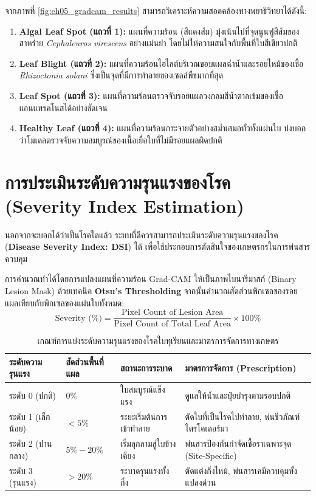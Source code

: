 จากภาพที่ \ref{fig:ch05_gradcam_results} สามารถวิเคราะห์ความสอดคล้องทางพยาธิวิทยาได้ดังนี้:
\begin{enumerate}[leftmargin=1.5em, itemsep=2pt]
    \item \textbf{Algal Leaf Spot (แถวที่ 1):} แผนที่ความร้อน (สีแดงส้ม) มุ่งเน้นไปที่จุดนูนฟูสีส้มของสาหร่าย \textit{Cephaleuros virescens} อย่างแม่นยำ โดยไม่ให้ความสนใจกับพื้นที่ใบสีเขียวปกติ
    \item \textbf{Leaf Blight (แถวที่ 2):} แผนที่ความร้อนไฮไลต์บริเวณขอบแผลฉ่ำน้ำและรอยไหม้ของเชื้อ \textit{Rhizoctonia solani} ซึ่งเป็นจุดที่มีการทำลายของเซลล์พืชมากที่สุด
    \item \textbf{Leaf Spot (แถวที่ 3):} แผนที่ความร้อนตรวจจับรอยแผลวงกลมสีน้ำตาลเข้มของเชื้อแอนแทรคโนสได้อย่างชัดเจน
    \item \textbf{Healthy Leaf (แถวที่ 4):} แผนที่ความร้อนกระจายตัวอย่างสม่ำเสมอทั่วทั้งแผ่นใบ บ่งบอกว่าโมเดลตรวจจับความสมบูรณ์ของเนื้อเยื่อใบที่ไม่มีรอยแผลผิดปกติ
\end{enumerate}

\section{การประเมินระดับความรุนแรงของโรค (Severity Index Estimation)}

นอกจากจะบอกได้ว่าเป็นโรคใดแล้ว ระบบที่ดีควรสามารถประเมินระดับความรุนแรงของโรค (\textbf{Disease Severity Index: DSI}) ได้ เพื่อใช้ประกอบการตัดสินใจของเกษตรกรในการพ่นสารควบคุม

การคำนวณทำได้โดยการแปลงแผนที่ความร้อน Grad-CAM ให้เป็นภาพไบนารีมาสก์ (Binary Lesion Mask) ด้วยเทคนิค \textbf{Otsu's Thresholding} จากนั้นคำนวณสัดส่วนพิกเซลของรอยแผลเทียบกับพิกเซลของแผ่นใบทั้งหมด:
\begin{equation}
\text{Severity (\%)} = \frac{\text{Pixel Count of Lesion Area}}{\text{Pixel Count of Total Leaf Area}} \times 100\%
\end{equation}

\begin{table}[H]
\caption{เกณฑ์การแบ่งระดับความรุนแรงของโรคใบทุเรียนและมาตรการจัดการทางเกษตร}
\label{tab:ch05_severity_levels}
\begin{tabularx}{\textwidth}{L{2.0cm}C{2.0cm}L{2.6cm}Y}
\toprule
\textbf{ระดับความรุนแรง} & \textbf{สัดส่วนพื้นที่แผล} & \textbf{สถานะการระบาด} & \textbf{มาตรการจัดการ (Prescription)} \\
\midrule
ระดับ 0 (ปกติ) & $0\%$ & ใบสมบูรณ์แข็งแรง & ดูแลให้น้ำและปุ๋ยบำรุงตามรอบปกติ \\
ระดับ 1 (เล็กน้อย) & $< 5\%$ & ระยะเริ่มต้นการเข้าทำลาย & ตัดใบที่เป็นโรคไปทำลาย, พ่นชีวภัณฑ์ไตรโคเดอร์มา \\
ระดับ 2 (ปานกลาง) & $5\% - 20\%$ & เริ่มลุกลามสู่ใบข้างเคียง & พ่นสารป้องกันกำจัดเชื้อราเฉพาะจุด (Site-Specific) \\
ระดับ 3 (รุนแรง) & $> 20\%$ & ระบาดรุนแรงทั้งกิ่ง & ตัดแต่งกิ่งไหม้, พ่นสารเคมีควบคุมทั้งแปลงด่วน \\
\bottomrule
\end{tabularx}
\end{table}

